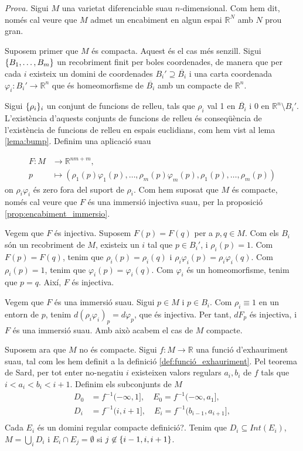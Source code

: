 {
    \color{green!50!black} \textit{Prova.}
    Sigui $M$ una varietat diferenciable suau $n$-dimensional. Com hem dit, només cal veure que $M$ admet un encabiment en algun espai $\mathbb R^N$ amb $N$ prou gran.

    Suposem primer que $M$ és compacta. Aquest és el cas més senzill. Sigui $\{B_1,\dots,B_m\}$ un recobriment finit per boles coordenades, de manera que per cada $i$ existeix un domini de coordenades $B_i'\supseteq \overline{B_i}$ i una carta coordenada $\varphi_i:B_i'\to\mathbb R^n$ que és homeomorfisme de $\overline{B_i}$ amb un compacte de $\mathbb R^n$.

    Sigui $\{\rho_i\}_i$ un conjunt de funcions de relleu, tals que $\rho_i$ val 1 en $\overline{B_i}$ i 0 en $\mathbb R^n\setminus B_i'$. L'existència d'aquests conjunts de funcions de relleu és conseqüència de l'existència de funcions de relleu en espais euclidians, com hem vist al lema \ref{lema:bump}. Definim una aplicació suau

    \begin{align*}
        F:M&\to\mathbb R^{nm + m},\\
        p&\mapsto \left(\rho_1(p)\varphi_1(p),\dots,\rho_m(p)\varphi_m(p), \rho_1(p),\dots,\rho_m(p)\right)
    \end{align*}
    on $\rho_i\varphi_i$ és zero fora del suport de $\rho_i$. Com hem suposat que $M$ és compacte, només cal veure que $F$ és una immersió injectiva suau, per la proposició \ref{prop:encabiment_immersio}.

    Vegem que $F$ és injectiva. Suposem $F(p) = F(q)$ per a $p,q\in M$. Com els $B_i$ són un recobriment de $M$, existeix un $i$ tal que $p\in B_i'$, i $\rho_i(p)=1$. Com $F(p) = F(q)$, tenim que $\rho_i(p) = \rho_i(q)$ i $\rho_i\varphi_i(p) = \rho_i\varphi_i(q)$. Com $\rho_i(p)=1$, tenim que $\varphi_i(p) = \varphi_i(q)$. Com $\varphi_i$ és un homeomorfisme, tenim que $p=q$. Així, $F$ és injectiva.

    Vegem que $F$ és una immersió suau. Sigui $p\in M$ i $p\in B_i$. Com $\rho_i\equiv1$ en un entorn de $p$, tenim $d(\rho_i\varphi_i)_p = d\varphi_p$, que és injectiva. Per tant, $dF_p$ és injectiva, i $F$ és una immersió suau.
    Amb això acabem el cas de $M$ compacte.

    Suposem ara que $M$ no és compacte. Sigui $f:M\to \mathbb R$ una funció d'exhauriment suau, tal com les hem definit a la definició \ref{def:funció_exhauriment}. Pel teorema de Sard, per tot enter no-negatiu $i$ existeixen valors regulars $a_i,b_i$ de $f$ tals que $i<a_i<b_i<i+1$. Definim els subconjunts de $M$
    \begin{align*}
        D_0 &= f^{-1}(-\infty,1],\quad E_0 = f^{-1}(-\infty,a_1],\\
        D_i &= f^{-1}(i,i+1],\quad E_i = f^{-1}(b_{i-1},a_{i+1}],\\
    \end{align*}
    Cada $E_i$ és un domini regular compacte {\color{blue} definició?}. Tenim que $D_i\subseteq Int(E_i)$, $M=\bigcup_i D_i$ i $E_i\cap E_j = \emptyset$ si $j\not\in\{i-1,i,i+1\}$. 

}
